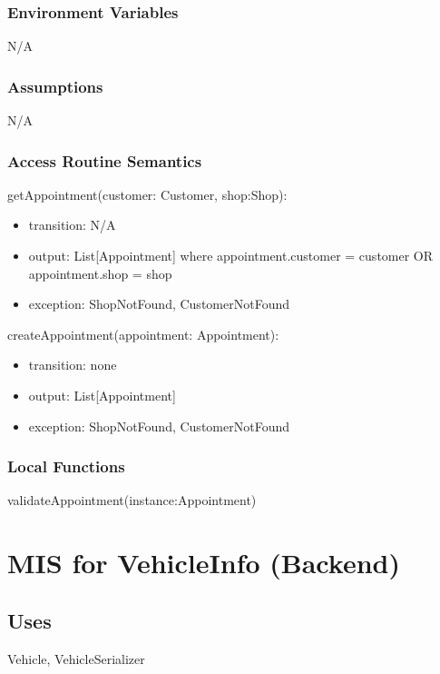 \documentclass[12pt, titlepage]{article}
\begin{document}
\subsubsection{Environment Variables}

N/A

\subsubsection{Assumptions}

N/A

\subsubsection{Access Routine Semantics}

\noindent getAppointment(customer: Customer, shop:Shop):
\begin{itemize}
    \item transition: N/A
    \item output: List[Appointment] where appointment.customer = customer OR appointment.shop = shop
    \item exception: ShopNotFound, CustomerNotFound
\end{itemize}

\noindent createAppointment(appointment: Appointment):
\begin{itemize}
    \item transition: none
    \item output: List[Appointment]
    \item exception: ShopNotFound, CustomerNotFound
\end{itemize}

\subsubsection{Local Functions}

validateAppointment(instance:Appointment)

\newpage
\section{MIS for VehicleInfo (Backend)}
    \subsection{Uses}
        Vehicle, VehicleSerializer
\end{document}
